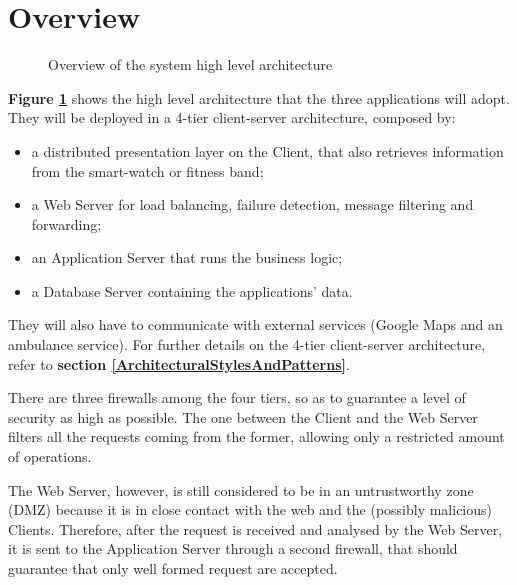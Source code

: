 \section{Overview}

\begin{figure}[H]
    \centering
    \caption{Overview of the system high level architecture}
    \label{fig:overview}
\end{figure}
\textbf{Figure \ref{fig:overview}} shows the high level architecture that the three applications will adopt.
They will be deployed in a 4-tier client-server architecture, composed by:
\begin{itemize}
    \item a distributed presentation layer on the Client, that also retrieves information from the smart-watch or fitness band;
    \item a Web Server for load balancing, failure detection, message filtering and forwarding;
    \item an Application Server that runs the business logic;
    \item a Database Server containing the applications' data.
\end{itemize}
They will also have to communicate with external services (Google Maps and an ambulance service). For further details on the 4-tier client-server architecture, refer to \textbf{section \ref{ArchitecturalStylesAndPatterns}}.

There are three firewalls among the four tiers, so as to guarantee a level of security as high as possible. The one between the Client and the Web Server filters all the requests coming from the former, allowing only a restricted amount of operations. 

The Web Server, however, is still considered to be in an untrustworthy zone (DMZ) because it is in close contact with the web and the (possibly malicious) Clients. Therefore, after the request is received and analysed by the Web Server, it is sent to the Application Server through a second firewall, that should guarantee that only well formed request are accepted. 

